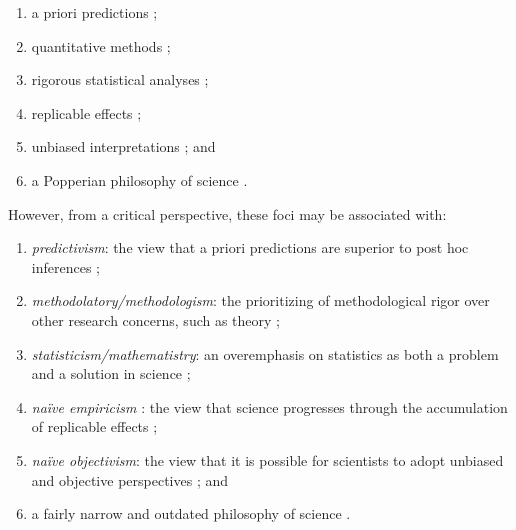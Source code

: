 \documentclass[authordate, meta, issue]{jote-new-article}
\begin{document}
\begin{enumerate}


  \item a priori predictions \parencites[e.g.,][p. 36]{Chambers2022}[p. 154]{Simmons2021};



  \item quantitative methods \parencites{Bennett2021}[p. 691]{Hamlin2017}[p. 530]{Pownall2021};


  \item rigorous statistical analyses \parencites[for a review, see][]{Moody2022};


  \item replicable effects \parencites[e.g.,][p. 617]{Nosek2012}[p. 153]{Simmons2021};



  \item unbiased interpretations \parencites[e.g.,][]{Hardwicke2023}[p. 166]{Vazire2022}; and



  \item a Popperian philosophy of science \parencites{Flis2019}[p. 74]{Grossmann2021}{Morawski2019}{Morawski2022}[for examples, see][]{Derksen2019}.


\end{enumerate}

However, from a critical perspective, these foci may be associated with:

\begin{enumerate}


  \item \emph{predictivism}: the view that a priori predictions are superior to post hoc inferences \parencites[p. 1605]{Oberauer2019a}{Rubin2017b}{Rubin2022};



  \item \emph{methodolatory/methodologism}: the prioritizing of methodological rigor over other research concerns, such as theory \parencites{Chamberlain2000}[p. 5]{Danziger1990}{Gao2014};



  \item \emph{statisticism/mathematistry}: an overemphasis on statistics as both a problem and a solution in science \parencites{Boring1919}{Brower1949}{Fiedler2018}{Proulx2021};


  \item \emph{naïve empiricism} \parencites{Strong1991}: the view that science progresses through the accumulation of replicable effects \parencites{Flis2022}{Proulx2021}{vanRooij2021};


  \item \emph{naïve objectivism}: the view that it is possible for scientists to adopt unbiased and objective perspectives \parencites{Field2021}{Penders2022}{Wiggins2019}; and



  \item a fairly narrow and outdated philosophy of science \parencites{Derksen2019}[p. 170]{Flis2019}[p. 74]{Grossmann2021}[p. 226, p. 233]{Morawski2019}.


\end{enumerate}
\end{document}
